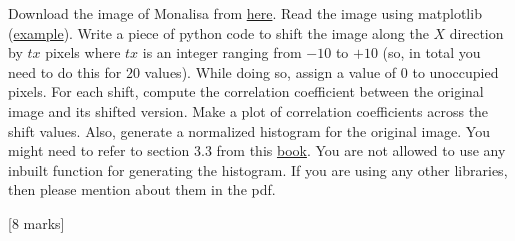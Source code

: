 \begin{que}
	Download the image of Monalisa from \href{https://en.wikipedia.org/wiki/File:Mona_Lisa.jpg}{here}. Read the image using matplotlib (\href{https://people.ciirc.cvut.cz/~xmatousm/mfftdv/lab1.html}{example}). Write a
	piece of python code to shift the image along the $X$ direction by $tx$ pixels where $tx$ is an integer
	ranging from $-10$ to $+10$ (so, in total you need to do this for $20$ values). While doing so, assign
	a value of $0$ to unoccupied pixels. For each shift, compute the correlation coefficient between the
	original image and its shifted version. Make a plot of correlation coefficients across the shift values.
	Also, generate a normalized histogram for the original image. You might need to refer to section
	3.3 from this \href{https://dl.icdst.org/pdfs/files4/01c56e081202b62bd7d3b4f8545775fb.pdf}{book}. You are not allowed to use any inbuilt function for generating the histogram.
	If you are using any other libraries, then please mention about them in the pdf.

	\hspace*{\fill} [8 marks]
\end{que}

